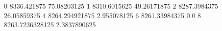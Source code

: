 0 8336.421875 75.08203125
1 8310.6015625 49.26171875
2 8287.3984375 26.05859375
4 8264.294921875 2.955078125
6 8261.33984375 0.0
8 8263.7236328125 2.3837890625
